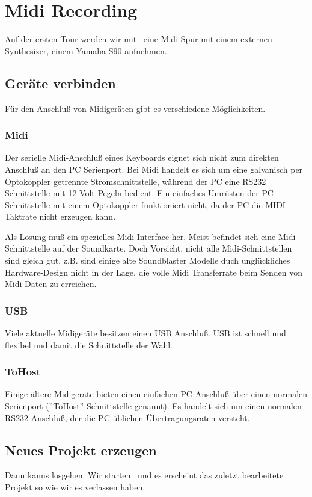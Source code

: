 \section{Midi Recording}
      Auf der ersten Tour werden wir mit \M\ eine Midi Spur
      mit einem externen Synthesizer, einem Yamaha S90 aufnehmen.

   \subsection{Geräte verbinden}
      Für den Anschluß von Midigeräten gibt es verschiedene Möglichkeiten.

      \subsubsection{Midi}
      Der serielle Midi-Anschluß eines Keyboards eignet sich nicht zum
      direkten Anschluß an den PC Serienport. Bei Midi handelt es sich
      um eine galvanisch per Optokoppler getrennte Stromschnittstelle,
      während der PC eine RS232 Schnittstelle mit 12 Volt Pegeln bedient.
      Ein einfaches Umrüsten der PC-Schnittstelle mit einem Optokoppler
      funktioniert nicht, da der PC die MIDI-Taktrate nicht erzeugen kann.

      Als Lösung muß ein spezielles Midi-Interface her. Meist befindet sich
      eine Midi-Schnittstelle auf der Soundkarte. Doch Vorsicht, nicht
      alle Midi-Schnittstellen sind gleich gut, z.B. sind einige alte
      Soundblaster Modelle duch unglückliches Hardware-Design nicht in der
      Lage, die volle Midi Transferrate beim Senden von Midi Daten zu
      erreichen.

      \subsubsection{USB}
      Viele aktuelle Midigeräte besitzen einen USB Anschluß. USB ist schnell
      und flexibel und damit die Schnittstelle der Wahl.

      \subsubsection{ToHost}
      Einige ältere Midigeräte bieten einen einfachen PC Anschluß über 
      einen normalen Serienport (''ToHost'' Schnittstelle genannt). Es
      handelt sich um einen normalen RS232 Anschluß, der die PC-üblichen
      Übertragungsraten versteht.

   \subsection{Neues Projekt erzeugen}
      Dann kanns losgehen. Wir starten \M\ und es erscheint das
      zuletzt bearbeitete Projekt so wie wir es verlassen haben.

